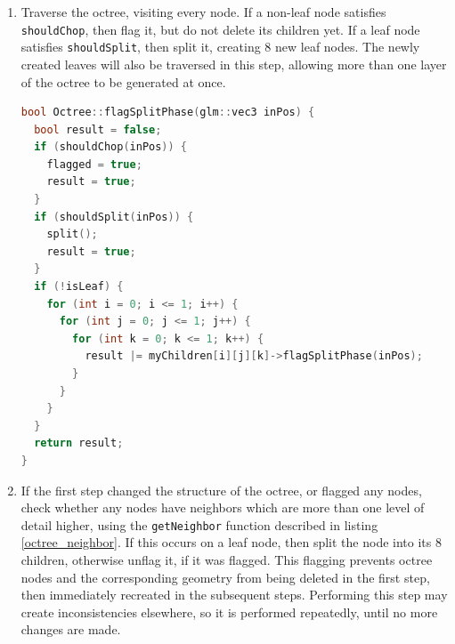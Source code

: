 \documentclass[11pt]{article}
\begin{document}
\begin{enumerate}
  \item Traverse the octree, visiting every node. If a non-leaf node satisfies \texttt{shouldChop}, then flag it, but do not delete its children yet. If a leaf node satisfies \texttt{shouldSplit}, then split it, creating 8 new leaf nodes. The newly created leaves will also be traversed in this step, allowing more than one layer of the octree to be generated at once.
  
  \begin{lstlisting}[language=C++,label={flagsplitphase},caption={The first stage in the octree refinement process.}]
bool Octree::flagSplitPhase(glm::vec3 inPos) {
  bool result = false;
  if (shouldChop(inPos)) {
    flagged = true;
    result = true;
  } 
  if (shouldSplit(inPos)) {
    split();
    result = true;
  }
  if (!isLeaf) {
    for (int i = 0; i <= 1; i++) {
      for (int j = 0; j <= 1; j++) {
        for (int k = 0; k <= 1; k++) {
          result |= myChildren[i][j][k]->flagSplitPhase(inPos);
        }
      }
    }
  }
  return result;
}
  \end{lstlisting}
  \item  If the first step changed the structure of the octree, or flagged any nodes, check whether any nodes have neighbors which are more than one level of detail higher, using the \texttt{getNeighbor} function described in listing \ref{octree_neighbor}. If this occurs on a leaf node, then split the node into its 8 children, otherwise unflag it, if it was flagged. This flagging prevents octree nodes and the corresponding geometry from being deleted in the first step, then immediately recreated in the subsequent steps. Performing this step may create inconsistencies elsewhere, so it is performed repeatedly, until no more changes are made.


\end{enumerate}
\end{document}
